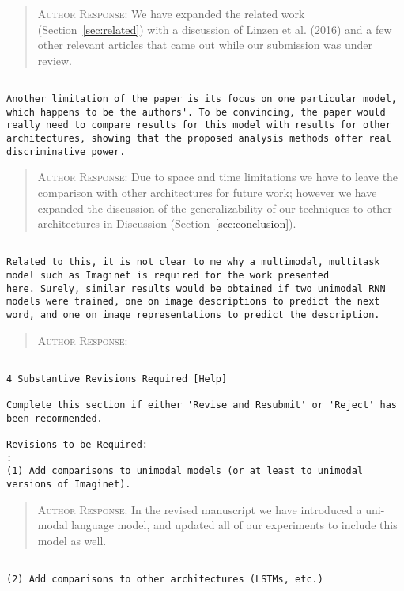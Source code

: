 \begin{quote}
\textsc{Author Response:} We have expanded the related work 
(Section~\ref{sec:related}) with a discussion of Linzen et al. (2016) 
and a few other relevant articles that came out while our submission was under review.
\end{quote}
\begin{verbatim}

Another limitation of the paper is its focus on one particular model,
which happens to be the authors'. To be convincing, the paper would
really need to compare results for this model with results for other
architectures, showing that the proposed analysis methods offer real
discriminative power.
\end{verbatim}  
\begin{quote}
\textsc{Author Response:}  Due to space and time limitations we have to 
leave the comparison with other architectures for future work; however we 
have expanded the discussion of the generalizability of our techniques to other
architectures in Discussion (Section~\ref{sec:conclusion}).
\end{quote}
\begin{verbatim}

Related to this, it is not clear to me why a multimodal, multitask
model such as Imaginet is required for the work presented
here. Surely, similar results would be obtained if two unimodal RNN
models were trained, one on image descriptions to predict the next
word, and one on image representations to predict the description.
\end{verbatim}  
\begin{quote}
\textsc{Author Response:}  
\end{quote}
\begin{verbatim}

4 Substantive Revisions Required [Help]

Complete this section if either 'Revise and Resubmit' or 'Reject' has
been recommended.

Revisions to be Required:
: 
(1) Add comparisons to unimodal models (or at least to unimodal
versions of Imaginet).
\end{verbatim}  
\begin{quote}
\textsc{Author Response:}  In the revised manuscript we have introduced a uni-modal language model, and updated all of our experiments to include this model as well.
\end{quote}
\begin{verbatim}

(2) Add comparisons to other architectures (LSTMs, etc.)
\end{verbatim}  
